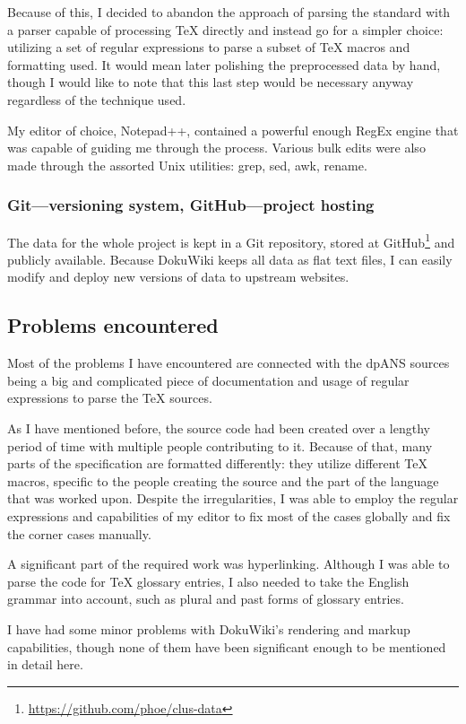 Because of this, I decided to abandon the approach of parsing the standard with a parser capable of processing \TeX{} directly and instead go for a simpler choice: utilizing a set of regular expressions to parse a subset of \TeX{} macros and formatting used. It would mean later polishing the preprocessed data by hand, though I would like to note that this last step would be necessary anyway regardless of the technique used.

My editor of choice, Notepad++, contained a powerful enough RegEx engine that was capable of guiding me through the process. Various bulk edits were also made through the assorted Unix utilities: grep, sed, awk, rename.

\subsubsection{Git---versioning system, GitHub---project hosting}

The data for the whole project is kept in a Git repository, stored at GitHub\footnote{\url{https://github.com/phoe/clus-data}} and publicly available. Because DokuWiki keeps all data as flat text files, I can easily modify and deploy new versions of data to upstream websites.

\subsection{Problems encountered}

Most of the problems I have encountered are connected with the dpANS sources being a big and complicated piece of documentation and usage of regular expressions to parse the \TeX{} sources.

As I have mentioned before, the source code had been created over a lengthy period of time with multiple people contributing to it. Because of that, many parts of the specification are formatted differently: they utilize different \TeX{} macros, specific to the people creating the source and the part of the language that was worked upon. Despite the irregularities, I was able to employ the regular expressions and capabilities of my editor to fix most of the cases globally and fix the corner cases manually.

A significant part of the required work was hyperlinking. Although I was able to parse the code for \TeX{} glossary entries, I also needed to take the English grammar into account, such as plural and past forms of glossary entries.

I have had some minor problems with DokuWiki's rendering and markup capabilities, though none of them have been significant enough to be mentioned in detail here.
